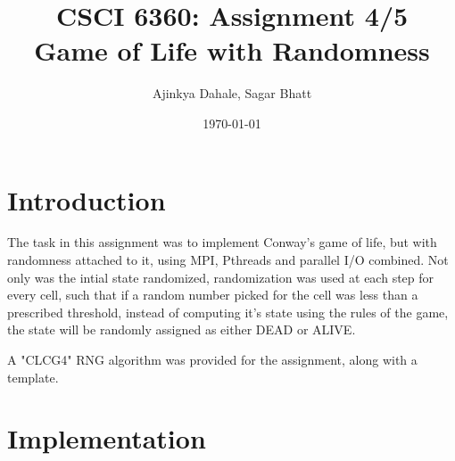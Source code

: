 \documentclass[letter,11pt]{article}
\author{Ajinkya Dahale, Sagar Bhatt}
\date{\today}
\title{CSCI 6360: Assignment 4/5 \\ Game of Life with Randomness}
\begin{document}
\maketitle

\section{Introduction}
\label{sec-1}

The task in this assignment was to implement Conway's game of life, but with randomness attached to it, using MPI, Pthreads and parallel I/O combined. Not only was the intial state randomized, randomization was used at each step for every cell, such that if a random number picked for the cell was less than a prescribed threshold, instead of computing it's state using the rules of the game, the state will be randomly assigned as either DEAD or ALIVE.

A "CLCG4" RNG algorithm was provided for the assignment, along with a template.

\section{Implementation}
\label{sec-2}
\end{document}
